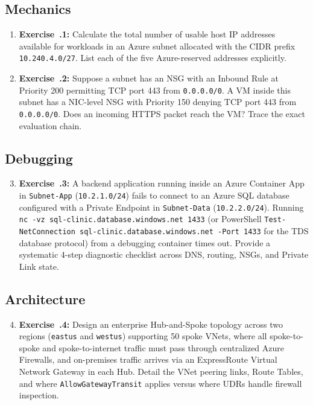 \subsection{Mechanics}
\begin{enumerate}[leftmargin=18pt]
  \item \textbf{Exercise~\thechapter.1:} Calculate the total number of usable host IP addresses available for workloads in an Azure subnet allocated with the CIDR prefix \texttt{10.240.4.0/27}. List each of the five Azure-reserved addresses explicitly.
  \item \textbf{Exercise~\thechapter.2:} Suppose a subnet has an NSG with an Inbound Rule at Priority 200 permitting TCP port 443 from \texttt{0.0.0.0/0}. A VM inside this subnet has a NIC-level NSG with Priority 150 denying TCP port 443 from \texttt{0.0.0.0/0}. Does an incoming HTTPS packet reach the VM? Trace the exact evaluation chain.
\end{enumerate}

\subsection{Debugging}
\begin{enumerate}[leftmargin=18pt]
  \setcounter{enumi}{2}
  \item \textbf{Exercise~\thechapter.3:} A backend application running inside an Azure Container App in \texttt{Subnet-App} (\texttt{10.2.1.0/24}) fails to connect to an Azure SQL database configured with a Private Endpoint in \texttt{Subnet-Data} (\texttt{10.2.2.0/24}). Running \texttt{nc -vz sql-clinic.database.windows.net 1433} (or PowerShell \texttt{Test-NetConnection sql-clinic.database.windows.net -Port 1433} for the TDS database protocol) from a debugging container times out. Provide a systematic 4-step diagnostic checklist across DNS, routing, NSGs, and Private Link state.
\end{enumerate}

\subsection{Architecture}
\begin{enumerate}[leftmargin=18pt]
  \setcounter{enumi}{3}
  \item \textbf{Exercise~\thechapter.4:} Design an enterprise Hub-and-Spoke topology across two regions (\texttt{eastus} and \texttt{westus}) supporting 50 spoke VNets, where all spoke-to-spoke and spoke-to-internet traffic must pass through centralized Azure Firewalls, and on-premises traffic arrives via an ExpressRoute Virtual Network Gateway in each Hub. Detail the VNet peering links, Route Tables, and where \texttt{AllowGatewayTransit} applies versus where UDRs handle firewall inspection.
\end{enumerate}

